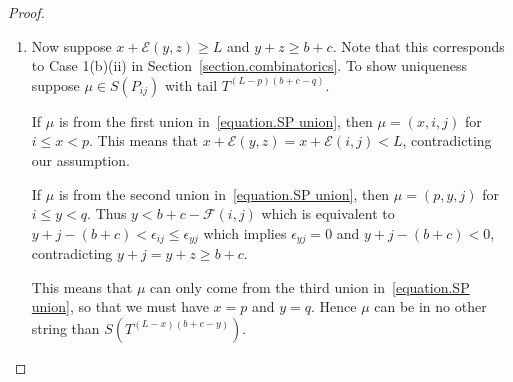 \documentclass[11pt,reqno]{amsart}
\theoremstyle{definition}
\numberwithin{equation}{section}
\begin{document}
\begin{proof}
\begin{enumerate}
{Now since $P_{(L+z-x)z}$ is indeed a pseudohead, the facts that $L-\mathcal{E}(L+z-x,z)=L-(L-x)=x$ and 
$L+z-x \leqslant y <b+c-\mathcal{F}(L+z-z,z)$ (since the latter is equal to $b+c-z$) imply that  $\mu \in S(P_{(L+z-x)z})$
(in the second union in~\eqref{equation.SP union}).}

\item{ Now suppose $x+\mathcal{E}(y,z)\geqslant L$ and $y+z \geqslant b+c$.  
Note that this corresponds to Case 1(b)(ii) in Section~\ref{section.combinatorics}. 
To show uniqueness suppose $\mu \in S(P_{ij})$ with tail $T^{(L-p)(b+c-q)}$. 

If $\mu$ is from the first union in~\eqref{equation.SP union}, then $\mu = (x,i,j)$ for $i \leqslant x <p$. This means 
that $x+\mathcal{E}(y,z)=x+\mathcal{E}(i,j)<L$, contradicting our assumption.

If $\mu$ is from the second union in~\eqref{equation.SP union}, then $\mu=(p,y,j)$ for $i \leqslant y <q$. 
Thus $y<b+c-\mathcal{F}(i,j)$ which is equivalent to $y+j-(b+c)<\epsilon_{ij} \leqslant \epsilon_{yj}$ which implies 
$\epsilon_{yj}=0$ and $y+j-(b+c)<0$, contradicting $y+j=y+z \geqslant b+c$.

This means that $\mu$ can only come from the third union in~\eqref{equation.SP union}, so that we must have $x=p$ 
and $y=q$.  Hence $\mu$ can be in no other string than $S(T^{(L-x)(b+c-y)})$.

}
\end{enumerate}
\end{proof}
\end{document}
